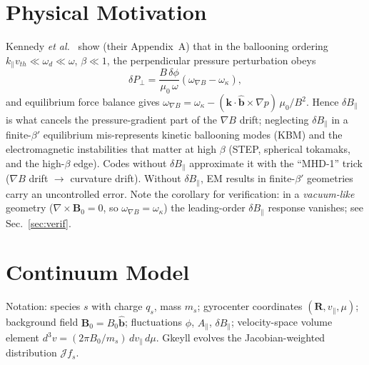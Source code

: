 \documentclass[11pt, letterpaper]{article}
\newcommand{\dBpar}{\delta B_\parallel}
\newcommand{\bhat}{\hat{\mathbf{b}}}
\newcommand{\vpar}{v_\parallel}
\newcommand{\Apar}{A_\parallel}
\begin{document}
\section{Physical Motivation}
Kennedy \emph{et al.}~\cite{Kennedy2024} show (their Appendix~A) that in the ballooning
ordering $k_\parallel v_{th} \ll \omega_d \ll \omega$, $\beta\ll 1$, the perpendicular pressure
perturbation obeys
\begin{equation}
  \delta P_\perp = \frac{B\,\delta\phi}{\mu_0\,\omega}\left(\omega_{\nabla B}-\omega_\kappa\right),
  \label{eq:kennedyA}
\end{equation}
and equilibrium force balance gives
$\omega_{\nabla B} = \omega_\kappa - (\mathbf{k}\cdot\bhat\times\nabla p)\,\mu_0/B^2$.
Hence $\dBpar$ is what cancels the pressure-gradient part of the $\nabla B$ drift; neglecting
$\dBpar$ in a finite-$\beta'$ equilibrium mis-represents kinetic ballooning modes (KBM) and the
electromagnetic instabilities that matter at high $\beta$ (STEP, spherical tokamaks, and the
high-$\beta$ edge). Codes without $\dBpar$ approximate it with the ``MHD-1'' trick
($\nabla B$ drift $\to$ curvature drift). Without $\dBpar$, EM results in
finite-$\beta'$ geometries carry an uncontrolled error. Note the corollary for verification:
in a \emph{vacuum-like} geometry ($\nabla\times\mathbf{B}_0=0$, so $\omega_{\nabla B}=\omega_\kappa$)
the leading-order $\dBpar$ response vanishes; see Sec.~\ref{sec:verif}.

\section{Continuum Model}
\label{sec:model}
Notation: species $s$ with charge $q_s$, mass $m_s$; gyrocenter coordinates
$(\mathbf{R},\vpar,\mu)$; background field $\mathbf{B}_0 = B_0\bhat$; fluctuations
$\phi$, $\Apar$, $\dBpar$; velocity-space volume element $d^3v = (2\pi B_0/m_s)\,d\vpar\,d\mu$.
Gkeyll evolves the Jacobian-weighted distribution $\mathcal{J}f_s$.
\end{document}
